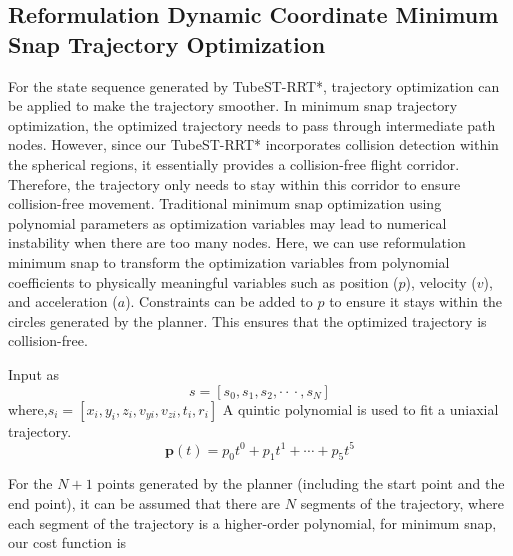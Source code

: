 \documentclass[conference]{IEEEtran}
\begin{document}
    \subsection{Reformulation Dynamic Coordinate Minimum Snap Trajectory Optimization}
    For the state sequence generated by TubeST-RRT*, trajectory optimization can be applied to make the trajectory smoother. In minimum snap trajectory optimization, the optimized trajectory needs to pass through intermediate path nodes. However, since our TubeST-RRT* incorporates collision detection within the spherical regions, it essentially provides a collision-free flight corridor. Therefore, the trajectory only needs to stay within this corridor to ensure collision-free movement. Traditional minimum snap optimization using polynomial parameters as optimization variables may lead to numerical instability when there are too many nodes. Here, we can use reformulation minimum snap to transform the optimization variables from polynomial coefficients to physically meaningful variables such as position ($p$), velocity ($v$), and acceleration ($a$). Constraints can be added to $p$ to ensure it stays within the circles generated by the planner. This ensures that the optimized trajectory is collision-free.

    Input as
    \begin{equation}
        s = [s_{0},s_{1},s_{2},\cdot{}\cdot{}\cdot{},s_{N}]
    \end{equation}
    where,$s_{i} = [x_{i},y_{i},z_{i},v_{yi},v_{zi},t_{i},r_{i}]$
    A quintic polynomial is used to fit a uniaxial trajectory.
    \begin{equation}
        \boldsymbol{p}\left( {t}\right)= {p}_{0} {t}^{0}+ {p}_{1} {t}^{1}+\cdots+ {p}_{5} {t}^{5}
    \end{equation}

    For the $N+1$ points generated by the planner (including the start point and the end point), it can be assumed that there are $N$ segments of the trajectory, where each segment of the trajectory is a higher-order polynomial, for minimum snap, our cost function is
\end{document}
